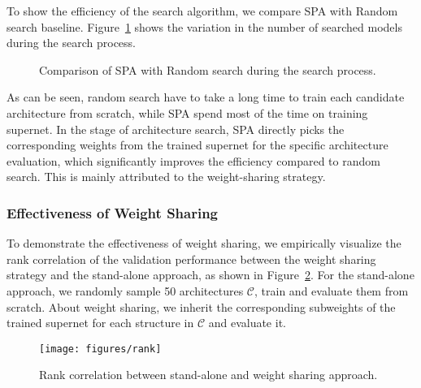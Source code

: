 \documentclass[11pt]{article}
\begin{document}
To show the efficiency of the search algorithm,
we compare SPA with Random search baseline.
Figure~\ref{fig-search_time} shows the variation in the number of searched models during the search process.

\begin{figure}[h]
	\vspace{-10px}
\caption{Comparison of SPA with Random search during the search process.} 
	\label{fig-search_time}
	\vspace{-10px}
\end{figure}

As can be seen,
random search have to take a long time 
to train each candidate architecture from scratch,
while SPA spend most of the time on training supernet.
In the stage of architecture search,
SPA directly picks the corresponding weights 
from the trained supernet 
for the specific architecture evaluation,
which significantly improves the efficiency compared to random search.
This is mainly attributed to the weight-sharing strategy.
\subsubsection{Effectiveness of Weight Sharing}

To demonstrate the effectiveness of weight sharing, 
we empirically visualize the rank correlation of the validation performance
between the weight sharing strategy
and the stand-alone approach,
as shown in Figure~\ref{fig-corr}. 
For the stand-alone approach,
we randomly sample 50 architectures $\mathcal{C}$, 
train and evaluate them from scratch.
About weight sharing,
we inherit the corresponding subweights of the trained supernet for each structure in $\mathcal{C}$ and evaluate it.

\begin{figure}[ht]
	\centering
	\texttt{[image: figures/rank]}
	\caption{Rank correlation between stand-alone and weight sharing approach.}
	\label{fig-corr}
	\vspace{-10px}
\end{figure}
\end{document}
